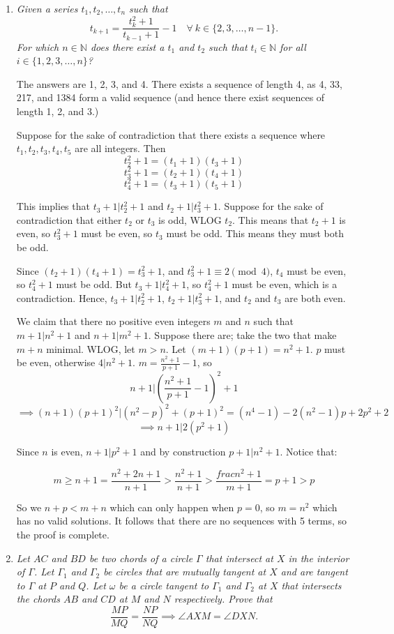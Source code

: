 \documentclass{article}
\begin{document}
\begin{enumerate}
\medskip
\item %
{\itshape Given a series $t_1, t_2, \dotsc, t_n$ such that 
\[ t_{k + 1} = \frac{t_k^2 + 1}{t_{k-1} + 1} - 1 \quad \forall \ k \in \{2, 3, \dots, n-1\}. \]
For which $n \in \mathbb{N}$ does there exist a $t_1$ and $t_2$ such that $t_i \in \mathbb{N}$ for all $i \in \{1, 2, 3, \dotsc, n\}$?}

The answers are 1, 2, 3, and 4. There exists a sequence of length 4, as 4, 33, 217, and 1384 form a valid sequence (and hence there exist sequences of length 1, 2, and 3.)

Suppose for the sake of contradiction that there exists a sequence where $t_1, t_2, t_3, t_4, t_5$ are all integers. Then $$t_2^2 + 1 = (t_1 + 1)(t_3 + 1)$$ 
$$t_3^2 + 1 = (t_2 + 1)(t_4 + 1)$$
$$t_4^2 + 1 = (t_3 + 1)(t_5 + 1)$$

This implies that $t_3 + 1 | t_2^2 + 1$ and $t_2 + 1 | t_3^2 + 1$. Suppose for the sake of contradiction that either $t_2$ or $t_3$ is odd, WLOG $t_2$. This means that $t_2 + 1$ is even, so $t_3^2 + 1$ must be even, so $t_3$ must be odd. This means they must both be odd. 

Since $(t_2 + 1)(t_4 + 1) = t_3^2 + 1$, and $t_3^2 + 1 \equiv 2 \pmod{4}$, $t_4$ must be even, so $t_4^2 + 1$ must be odd. But $t_3 + 1 | t_4^2 + 1$, so $t_4^2 + 1$ must be even, which is a contradiction. Hence, $t_3 + 1 | t_2^2 + 1$, $t_2 + 1 | t_3^2 + 1$, and $t_2$ and $t_3$ are both even.

We claim that there no positive even integers $m$ and $n$ such that $m+1 | n^2 + 1$ and $n+1 | m^2 + 1$. Suppose there are; take the two that make $m + n$ minimal. WLOG, let $m > n$. 
Let $(m+1)(p+1) = n^2 + 1$. $p$ must be even, otherwise $4 | n^2 + 1$. $m = \frac{n^2+1}{p+1} - 1$, so 
$$n + 1 | \left(\frac{n^2+1}{p+1} - 1\right)^2 + 1$$
$$ \implies (n+1)(p+1)^2 | (n^2 - p)^2 + (p+1)^2 = (n^4 - 1) - 2(n^2 - 1)p + 2p^2 + 2$$
$$\implies n+1 | 2(p^2+1)$$ 

Since $n$ is even, $n + 1 | p^2 + 1$ and by construction $p + 1 | n^2 + 1$. Notice that:

$$m \ge n + 1 = \frac{n^2 + 2n + 1}{n + 1} > \frac{n^2 + 1}{n + 1} > \frac{frac{n^2 + 1}}{m + 1} = p + 1 > p$$

So we $n + p < m + n$ which can only happen when $p = 0$, so $m = n^2$ which has no valid solutions. It follows that there are no sequences with 5 terms, so the proof is complete.



\medskip
\item %
{\itshape Let $AC$ and $BD$ be two chords of a circle $\Gamma$ that intersect at $X$ in the interior of $\Gamma$.
Let $\Gamma_1$ and $\Gamma_2$ be circles that are mutually tangent at $X$ and are tangent to $\Gamma$ at $P$ and $Q$.
Let $\omega$ be a circle tangent to $\Gamma_1$ and $\Gamma_2$ at $X$ that intersects the chords $AB$ and $CD$ at $M$ and $N$ respectively.
Prove that
\[
	\frac{MP}{MQ} = \frac{NP}{NQ} \implies \angle AXM = \angle DXN.
\]}




\end{enumerate}
\end{document}
